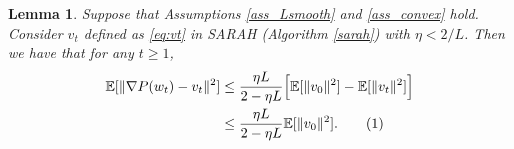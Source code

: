 \documentclass{article}
\newtheorem{lem}{Lemma}
\newtheorem{ass}{Assumption}
\newcommand\tagthis{\addtocounter{equation}{1}\tag{\theequation}}
\begin{document}
\begin{lem}\label{lem_bound_var_diff_str_02}
Suppose that Assumptions \ref{ass_Lsmooth} and \ref{ass_convex} hold. Consider $v_{t}$ defined as \eqref{eq:vt} in SARAH (Algorithm \ref{sarah}) with $\eta < 2/L$. Then we have that for any $t\geq 1$, 
\begin{align*}
\mathbb{E}[ \| \nabla P(w_{t}) - v_{t} \|^2 ] 
&\leq  \frac{\eta L}{2 - \eta L} \Big[ \mathbb{E}[ \|v_{0} \|^2] - \mathbb{E}[\| v_{t} \|^2] \Big]
\\%
&\leq  \frac{\eta L}{2 - \eta L}  \mathbb{E}[ \|v_{0} \|^2].
\tagthis\label{eq:bound1}
\end{align*}
\end{lem}


%
\end{document}

